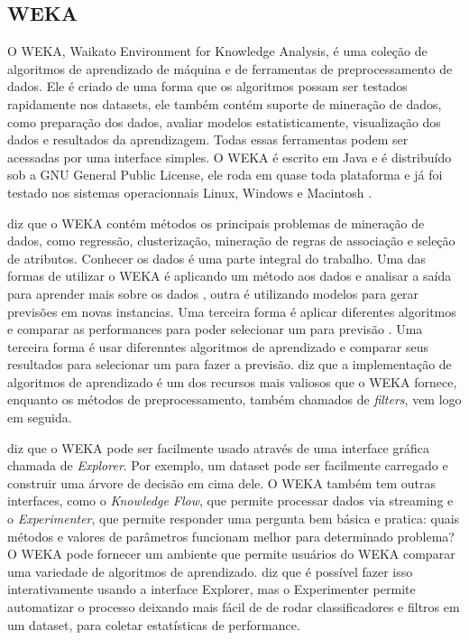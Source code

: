 \subsection{WEKA}
O WEKA, Waikato Environment for Knowledge Analysis, é uma coleção de algoritmos de aprendizado de máquina e de ferramentas de preprocessamento de dados. Ele é criado de uma forma que os algoritmos possam ser testados rapidamente nos datasets, ele também contém suporte de mineração de dados, como preparação dos dados, avaliar modelos estatisticamente, visualização dos dados e resultados da aprendizagem. Todas essas ferramentas podem ser acessadas por uma interface simples. O WEKA é escrito em Java e é distribuído sob a GNU General Public License, ele roda em quase toda plataforma e já foi testado nos sistemas operacionnais Linux, Windows e Macintosh .

 diz que o WEKA contém métodos os principais problemas de mineração de dados, como regressão, clusterização, mineração de regras de associação e seleção de atributos. Conhecer os dados é uma parte integral do trabalho. Uma das formas de utilizar o WEKA é aplicando um método aos dados e analisar a saída para aprender mais sobre os dados , outra é utilizando modelos para gerar previsões em novas instancias. Uma terceira forma é aplicar diferentes algoritmos e comparar as performances para poder selecionar um para previsão . Uma terceira forma é usar diferenntes algoritmos de aprendizado e comparar seus resultados para selecionar um para fazer a previsão.  diz que a implementação de algoritmos de aprendizado é um dos recursos mais valiosos que o WEKA fornece, enquanto os métodos de preprocessamento, também chamados de \textit{filters}, vem logo em seguida. 

 diz que o WEKA pode ser facilmente usado através de uma interface gráfica chamada de \textit{Explorer}. Por exemplo, um dataset pode ser facilmente carregado e construir uma árvore de decisão em cima dele. O WEKA também tem outras interfaces, como o \textit{Knowledge Flow}, que permite processar dados via streaming e o \textit{Experimenter}, que permite responder uma pergunta bem básica e pratica: quais métodos e valores de parâmetros funcionam melhor para determinado problema? O WEKA pode fornecer um ambiente que permite usuários do WEKA comparar uma variedade de algoritmos de aprendizado.  diz que é possível fazer isso interativamente usando a  interface Explorer, mas o Experimenter permite automatizar o processo deixando mais fácil de de rodar classificadores e filtros em um dataset, para coletar estatísticas de performance.

